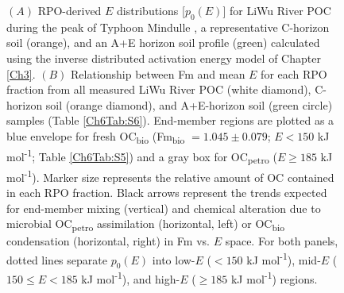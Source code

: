 \begin{figure}[p]
	\caption[RPO $p_{0}(E)$ and $E$ vs. Fm plots]{$(A)$ RPO-derived $E$ distributions [$p_{0}(E)$] for LiWu River POC during the peak of Typhoon Mindulle \citep[white;][]{Hilton:2008fo}, a representative C-horizon soil (orange), and an A+E horizon soil profile (green) calculated using the inverse distributed activation energy model of Chapter \ref{Ch3}. $(B)$ Relationship between Fm and mean $E$ for each RPO fraction from all measured LiWu River POC (white diamond), C-horizon soil (orange diamond), and A+E-horizon soil (green circle) samples (Table \ref{Ch6Tab:S6}). End-member regions are plotted as a blue envelope for fresh OC\textsubscript{bio} (Fm\textsubscript{bio} $= 1.045 \pm 0.079$; $E < 150$ kJ mol\textsuperscript{-1}; Table \ref{Ch6Tab:S5}) and a gray box for OC\textsubscript{petro} ($E \geq 185$ kJ mol\textsuperscript{-1}). Marker size represents the relative amount of OC contained in each RPO fraction. Black arrows represent the trends expected for end-member mixing (vertical) and chemical alteration due to microbial OC\textsubscript{petro} assimilation (horizontal, left) or OC\textsubscript{bio} condensation (horizontal, right) in Fm vs. $E$ space. For both panels, dotted lines separate $p_{0}(E)$ into low-$E$ ($<150$ kJ mol\textsuperscript{-1}), mid-$E$ ($150 \leq E < 185$ kJ mol\textsuperscript{-1}), and high-$E$ ($\geq 185$ kJ mol\textsuperscript{-1}) regions.}
	\label{Ch6Fig:2} 
\end{figure}

